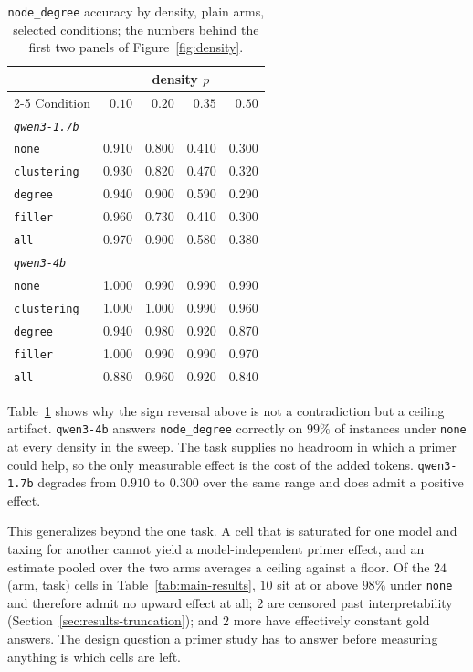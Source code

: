 \documentclass[11pt]{article}
\begin{document}
\begin{table}[t]
\centering
\small
\begin{tabular}{lrrrr}
\toprule
& \multicolumn{4}{c}{density $p$} \\
\cmidrule(lr){2-5}
Condition & $0.10$ & $0.20$ & $0.35$ & $0.50$ \\
\midrule
\multicolumn{5}{l}{\emph{\texttt{qwen3-1.7b}}} \\
\texttt{none}       & 0.910 & 0.800 & 0.410 & 0.300 \\
\texttt{clustering} & 0.930 & 0.820 & 0.470 & 0.320 \\
\texttt{degree}     & 0.940 & 0.900 & 0.590 & 0.290 \\
\texttt{filler}     & 0.960 & 0.730 & 0.410 & 0.300 \\
\texttt{all}        & 0.970 & 0.900 & 0.580 & 0.380 \\
\midrule
\multicolumn{5}{l}{\emph{\texttt{qwen3-4b}}} \\
\texttt{none}       & 1.000 & 0.990 & 0.990 & 0.990 \\
\texttt{clustering} & 1.000 & 1.000 & 0.990 & 0.960 \\
\texttt{degree}     & 0.940 & 0.980 & 0.920 & 0.870 \\
\texttt{filler}     & 1.000 & 0.990 & 0.990 & 0.970 \\
\texttt{all}        & 0.880 & 0.960 & 0.920 & 0.840 \\
\bottomrule
\end{tabular}
\caption{\texttt{node\_degree} accuracy by density, plain arms, selected
conditions; the numbers behind the first two panels of
Figure~\ref{fig:density}.}
\label{tab:density}
\end{table}

Table~\ref{tab:density} shows why the sign reversal above is not a
contradiction but a ceiling artifact. \texttt{qwen3-4b} answers
\texttt{node\_degree} correctly on $99\%$ of instances under \texttt{none}
at every density in the sweep. The task supplies no headroom in which a
primer could help, so the only measurable effect is the cost of the added
tokens. \texttt{qwen3-1.7b} degrades from $0.910$ to $0.300$ over the same
range and does admit a positive effect.

This generalizes beyond the one task. A cell that is saturated for one
model and taxing for another cannot yield a model-independent primer
effect, and an estimate pooled over the two arms averages a ceiling against
a floor. Of the $24$ (arm, task) cells in Table~\ref{tab:main-results}, $10$
sit at or above $98\%$ under \texttt{none} and therefore admit no upward
effect at all; $2$ are censored past interpretability
(Section~\ref{sec:results-truncation}); and $2$ more have effectively
constant gold answers. The design question a primer study has to answer
before measuring anything is which cells are left.
\end{document}

